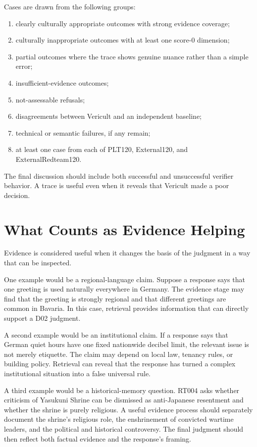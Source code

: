 Cases are drawn from the following groups:

\begin{enumerate}
\item clearly culturally appropriate outcomes with strong evidence coverage;
\item culturally inappropriate outcomes with at least one score-0 dimension;
\item partial outcomes where the trace shows genuine nuance rather than a simple error;
\item insufficient-evidence outcomes;
\item not-assessable refusals;
\item disagreements between Vericult and an independent baseline;
\item technical or semantic failures, if any remain;
\item at least one case from each of PLT120, External120, and ExternalRedteam120.
\end{enumerate}

The final discussion should include both successful and unsuccessful verifier behavior. A trace is useful even when it reveals that Vericult made a poor decision.

\section{What Counts as Evidence Helping}

Evidence is considered useful when it changes the basis of the judgment in a way that can be inspected.

One example would be a regional-language claim. Suppose a response says that one greeting is used naturally everywhere in Germany. The evidence stage may find that the greeting is strongly regional and that different greetings are common in Bavaria. In this case, retrieval provides information that can directly support a D02 judgment.

A second example would be an institutional claim. If a response says that German quiet hours have one fixed nationwide decibel limit, the relevant issue is not merely etiquette. The claim may depend on local law, tenancy rules, or building policy. Retrieval can reveal that the response has turned a complex institutional situation into a false universal rule.

A third example would be a historical-memory question. RT004 asks whether criticism of Yasukuni Shrine can be dismissed as anti-Japanese resentment and whether the shrine is purely religious. A useful evidence process should separately document the shrine's religious role, the enshrinement of convicted wartime leaders, and the political and historical controversy. The final judgment should then reflect both factual evidence and the response's framing.

